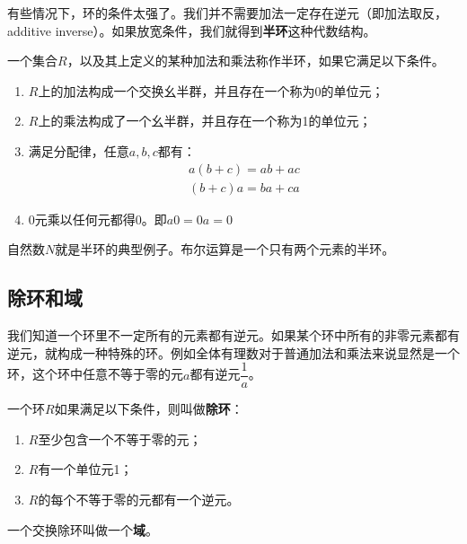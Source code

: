 \documentclass[b5paper]{ctexart}
\begin{document}
有些情况下，环的条件太强了。我们并不需要加法一定存在逆元（即加法取反，additive inverse）。如果放宽条件，我们就得到\textbf{半环}这种代数结构。

\begin{definition}
一个集合$R$，以及其上定义的某种加法和乘法称作半环，如果它满足以下条件。
\begin{enumerate}
\item $R$上的加法构成一个交换幺半群，并且存在一个称为0的单位元；
\item $R$上的乘法构成了一个幺半群，并且存在一个称为1的单位元；
\item 满足分配律，任意$a, b, c$都有：
\[
\begin{array}{l}
a(b + c) = ab + ac \\
(b + c)a = ba + ca
\end{array}
\]
\item 0元乘以任何元都得0。即$a0 = 0a = 0$
\end{enumerate}
\end{definition}
自然数$N$就是半环的典型例子。布尔运算是一个只有两个元素的半环。

\begin{Exercise}
\end{Exercise}

\subsection{除环和域}

我们知道一个环里不一定所有的元素都有逆元。如果某个环中所有的非零元素都有逆元，就构成一种特殊的环。例如全体有理数对于普通加法和乘法来说显然是一个环，这个环中任意不等于零的元$a$都有逆元$\dfrac{1}{a}$。

\begin{definition}
一个环$R$如果满足以下条件，则叫做\textbf{除环}：
\begin{enumerate}
\item $R$至少包含一个不等于零的元；
\item $R$有一个单位元1；
\item $R$的每个不等于零的元都有一个逆元。
\end{enumerate}
\end{definition}

\begin{definition}
一个交换除环叫做一个\textbf{域}。
\end{definition}
\end{document}

